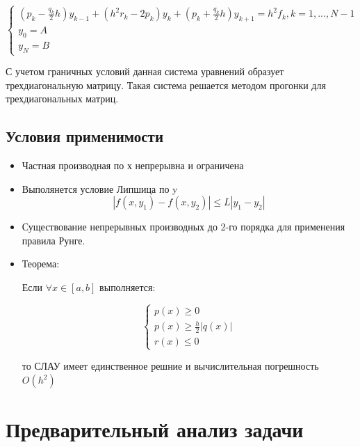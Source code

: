 \begin{equation}
	\begin{cases}
		(p_{k}-\frac{q_{k}}{2}h)y_{k-1}+(h^{2}r_{k}-2p_{k})y_{k}+(p_{k}+\frac{q_{k}}{2}h)y_{k+1}=h^{2}f_{k}, k=1,...,N-1 \\
		y_{0}= A \\
		y_{N} = B 	
	\end{cases}
\end{equation}

С учетом граничных условий данная система уравнений образует трехдиагональную матрицу. Такая система решается методом прогонки для трехдиагональных матриц.

\subsection{Условия применимости}

\begin{itemize}
	\item Частная производная по х непрерывна и ограничена
	\item Выполянется условие Липшица по y
	\begin{equation}
		|f(x,y_{1})-f(x,y_{2})| \leq L|y_{1}-y_{2}|
	\end{equation}
	\item Существование непрерывных производных до 2-го порядка для применения правила Рунге.
	\item Теорема: 
	
	Если  \begin{math}
	 \forall	x \in [a,b]
	\end{math} выполняется:

\begin{equation}
	\begin{cases}
		p(x) \geq 0 \\
		p(x) \geq \frac{h}{2}|q(x)| \\
		r(x) \leq 0
	\end{cases}
\end{equation}
 
 то СЛАУ имеет единственное решние и вычислительная погрешность \begin{math}
 	O(h^{2})
 \end{math}

\end{itemize}


\section{Предварительный анализ задачи}

